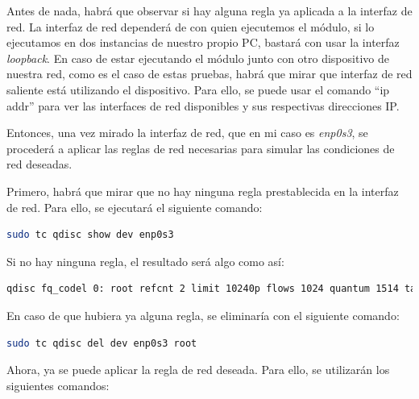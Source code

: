 Antes de nada, habrá que observar si hay alguna regla ya aplicada a la interfaz de red. La interfaz de red dependerá de con quien ejecutemos el módulo, si lo ejecutamos en dos instancias de nuestro propio PC, bastará con usar la interfaz \textit{loopback}. En caso de estar ejecutando el módulo junto con otro dispositivo de nuestra red, como es el caso de estas pruebas, habrá que mirar que interfaz de red saliente está utilizando el dispositivo. Para ello, se puede usar el comando ``ip addr'' para ver las interfaces de red disponibles y sus respectivas direcciones IP. 

\vspace{\baselineskip}
Entonces, una vez mirado la interfaz de red, que en mi caso es \textit{enp0s3}, se procederá a aplicar las reglas de red necesarias para simular las condiciones de red deseadas.

\vspace{\baselineskip}

Primero, habrá que mirar que no hay ninguna regla prestablecida en la interfaz de red. Para ello, se ejecutará el siguiente comando:
\begin{lstlisting}[language=bash]
sudo tc qdisc show dev enp0s3
\end{lstlisting}
Si no hay ninguna regla, el resultado será algo como así:
\begin{lstlisting}[language=bash, breaklines=true]
qdisc fq_codel 0: root refcnt 2 limit 10240p flows 1024 quantum 1514 target 5ms interval 100ms memory_limit 32Mb ecn drop_batch 64 
\end{lstlisting}

En caso de que hubiera ya alguna regla, se eliminaría con el siguiente comando:
\begin{lstlisting}[language=bash]
sudo tc qdisc del dev enp0s3 root
\end{lstlisting}

Ahora, ya se puede aplicar la regla de red deseada. Para ello, se utilizarán los siguientes comandos:

